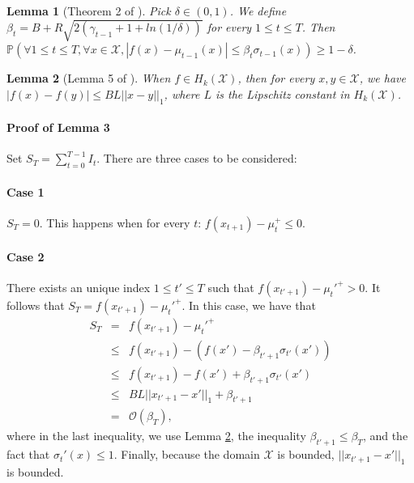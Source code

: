 \documentclass[twoside]{article}
\newtheorem{lemma}{Lemma}
\begin{document}
\begin{lemma}[Theorem 2 of \citet{Chowdhury17}]
Pick $\delta \in (0,1)$. We define $\beta_t = B + R\sqrt{2(\gamma_{t-1} + 1 + ln(1/\delta))}$ for every $1 \le t \le T$. Then $\mathbb{P}(\forall 1 \le t \le T, \forall x \in \mathcal X, |f(x) - \mu_{t-1}(x)| \le \beta_t \sigma_{t-1}(x) ) \ge 1 - \delta$.
\label{le_a}
\end{lemma}

\begin{lemma}[Lemma 5 of \citet{Freitas12}]
When $f \in H_k(\mathcal X)$, then for every $x, y \in \mathcal X$, we have $|f(x) - f(y)| \le BL||x -y||_1$,
where $L$ is the Lipschitz constant in $H_k(\mathcal X)$.
\label{le_b}
\end{lemma}

\paragraph{Proof of Lemma 3} Set $S_T = \sum_{t=0}^{T-1} I_t$. There are three cases to be considered:
\paragraph{Case 1} $S_T = 0$. This happens when for every $t$: $f(x_{t+1}) - \mu_t^+ \le 0$.
\paragraph{Case 2} There exists an unique index $1 \le t'\le T$ such that $f(x_{t'+1}) - \mu_t'^+ > 0$. It follows that $S_T = f(x_{t'+1}) - \mu_t'^+$. In this case, we have that
\begin{eqnarray*}
S_T  & = & f(x_{t'+1}) - \mu_t'^+ \\
& \le & f(x_{t'+1}) - (f(x') - \beta_{t'+1}\sigma_{t'}(x')) \\
& \le & f(x_{t'+1}) - f(x') + \beta_{t'+1}\sigma_{t'}(x') \\
& \le &  BL ||x_{t' + 1} - x'||_1 + \beta_{t'+1}\\
& = & \mathcal O(\beta_T),
\end{eqnarray*}
where in the last inequality, we use Lemma \ref{le_b}, the inequality $\beta_{t'+1} \le \beta_T$, and the fact that $\sigma_t'(x) \le 1$. Finally, because the domain $\mathcal X$ is bounded, $||x_{t' + 1} - x'||_1$ is bounded.
\end{document}
